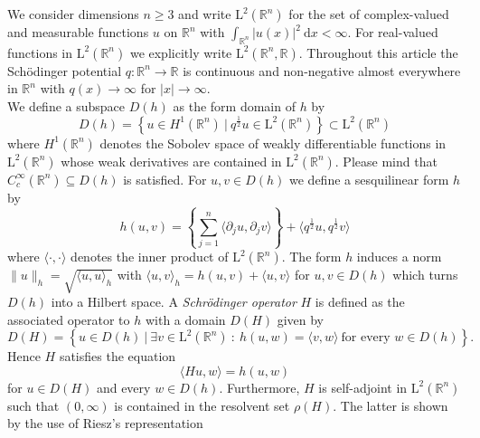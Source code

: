 \documentclass[12pt,longbibliography]{article}
\def\R{\mathbb{R}}
\theoremstyle{definition}
\theoremstyle{remark}
\theoremstyle{example}
\begin{document}
We consider dimensions $n \geq 3$ and write $\mathrm{L}^{2} \left( \R^{n} \right)$ 
for the set of complex-valued and measurable functions $u$ on $\R^{n}$ with $\int_{\R^{n}} |u(x)|^{2} \ \mathrm{d}x < \infty$.
For real-valued functions in $\mathrm{L}^{2}\left( \R^{n} \right)$ we explicitly write $\mathrm{L}^{2} \left( \R^{n}, \R \right)$.
Throughout this article the Schödinger potential $q \colon \R^{n} \to \R$ is continuous and 
non-negative almost everywhere in $\R^{n}$ with $q(x) \to \infty$ for $|x| \to \infty$.\\

We define a subspace $D(h)$ as the form domain of $h$ by
\begin{equation}
D(h) = \left\{  u \in H^{1}\left( \R^{n} \right) \ | \ q^{\frac{1}{2}}u \in  \mathrm{L}^{2}(\R^{n}) \right\}  \subset 
\mathrm{L}^{2}\left( \R^{n} \right)
\end{equation}
where $H^{1}\left( \R^{n} \right)$ denotes the Sobolev space of weakly differentiable functions in 
$\mathrm{L}^{2} \left( \R^{n} \right)$
whose weak derivatives are contained in $\mathrm{L}^{2} \left( \R^{n} \right)$. Please mind that 
$C_{c}^{\infty}\left( \R^{n} \right) \subseteq D(h)$ is satisfied. 
For $u,v \in D(h)$ we define a sesquilinear form $h$ by
\begin{equation}
h(u,v) = \left\{ \sum_{j = 1}^{n} \langle \partial_{j} u , 
\partial_{j} v \rangle \right\} + \langle q^{\frac{1}{2}}u, q^{\frac{1}{2}}v \rangle
\end{equation}
where $\langle \cdot , \cdot \rangle$ denotes the inner product of $\mathrm{L}^{2}(\R^{n})$. 
The form $h$ induces a norm $\| u \|_{h} = \sqrt{\langle u,u \rangle_{h}}$ with
$\langle u,v \rangle_{h} = h(u,v) + \langle u,v \rangle$ for  $u,v \in D(h)$ which turns $D(h)$ into a Hilbert space.
A \textit{Schrödinger operator} $H$ is defined as the associated operator to $h$ with a domain $D(H)$ given by
\begin{equation}
D(H) = 
\left\{  u \in  D(h) \ | \  
\exists v \in \mathrm{L}^{2} \left( \R^{n} \right) \ : \  h(u,w) = \langle v, w \rangle \ \text{for every } 
w \in D(h) \right\}.
\end{equation}
Hence $H$ satisfies the equation 
\begin{equation}
\langle Hu, w \rangle = h(u,w)
\end{equation}
for $u \in D(H)$ and every $w \in D(h)$. Furthermore, $H$ is self-adjoint in $\mathrm{L}^{2} \left( \R^{n} \right)$
such that $(0,\infty)$ is contained in the resolvent set $\rho (H)$. The latter is shown by the use of Riesz's representation 
\end{document}
